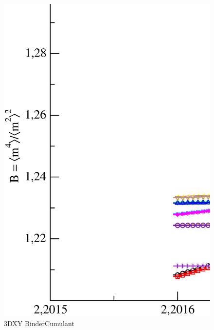 \begin{figure}[!htpb]
  \centering
  \includegraphics[width=\textwidth]{./plots/3DXY/vsT/BinderCumulant.eps}
  \caption{3DXY BinderCumulant}
\end{figure}

